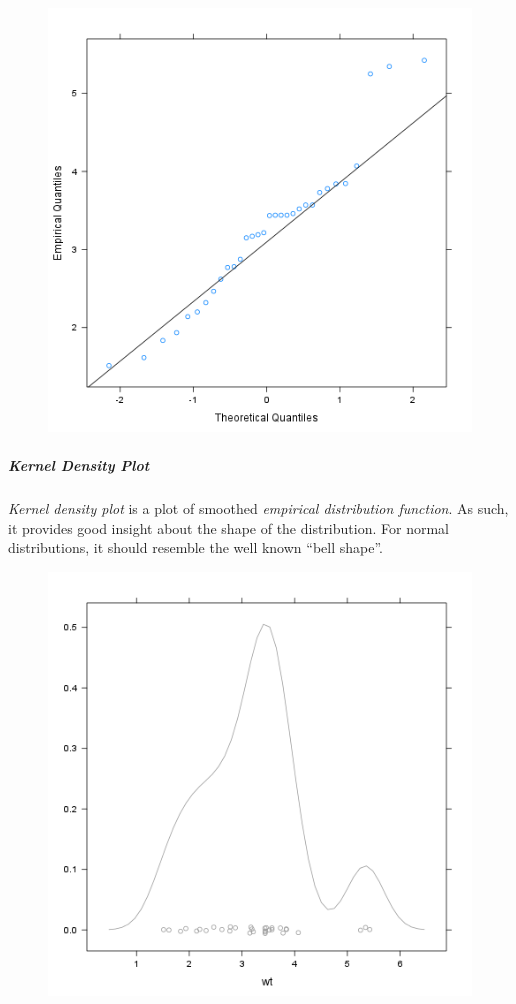 \documentclass[]{article}
\makeatletter
\def\maxwidth{\ifdim\Gin@nat@width>\linewidth\linewidth
\else\Gin@nat@width\fi}
\let\Oldincludegraphics\includegraphics
\renewcommand{\includegraphics}[1]{\Oldincludegraphics[width=\maxwidth]{#1}}
\makeatother
\begin{document}
\begin{figure}[htbp]
\centering
\includegraphics{ff471a5bcb80aaf91b4c053ab038d69a.png}
\caption{}
\end{figure}

\subparagraph{Kernel Density Plot}

\emph{Kernel density plot} is a plot of smoothed \emph{empirical
distribution function}. As such, it provides good insight about the
shape of the distribution. For normal distributions, it should resemble
the well known ``bell shape''.

\begin{figure}[htbp]
\centering
\includegraphics{c3769779837adedcb4198ec881cc946b.png}
\caption{}
\end{figure}
\end{document}
